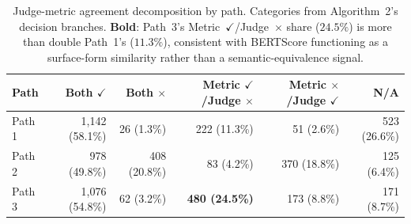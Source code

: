 \begin{table}[!htbp]
\centering
\small
\caption{Judge-metric agreement decomposition by path. Categories from Algorithm~2's decision branches. \textbf{Bold}: Path~3's Metric~$\checkmark$/Judge~$\times$ share ($24.5\%$) is more than double Path~1's ($11.3\%$), consistent with BERTScore functioning as a surface-form similarity rather than a semantic-equivalence signal.}
\label{tab:disagreement_by_path}
\begin{tabular}{lrrrrr}
\toprule
Path & Both $\checkmark$ & Both $\times$ & Metric $\checkmark$/Judge $\times$ & Metric $\times$/Judge $\checkmark$ & N/A \\
\midrule
Path 1 & 1,142 (58.1\%) & 26 (1.3\%) & 222 (11.3\%) & 51 (2.6\%) & 523 (26.6\%) \\
Path 2 & 978 (49.8\%) & 408 (20.8\%) & 83 (4.2\%) & 370 (18.8\%) & 125 (6.4\%) \\
Path 3 & 1,076 (54.8\%) & 62 (3.2\%) & \textbf{480 (24.5\%)} & 173 (8.8\%) & 171 (8.7\%) \\
\bottomrule
\end{tabular}
\end{table}